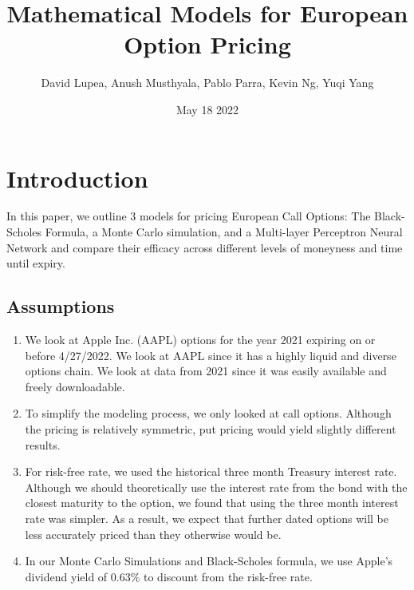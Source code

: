 \documentclass{article}
\title{Mathematical Models for European Option Pricing}
\author{David Lupea, Anush Musthyala, Pablo Parra, Kevin Ng, Yuqi Yang }
\date{May 18 2022}
\begin{document}
\maketitle
\tableofcontents 
\newpage

\section{Introduction}
In this paper, we outline 3 models for pricing European Call Options: The Black-Scholes Formula, a Monte Carlo simulation, and a Multi-layer Perceptron Neural Network and compare their efficacy across different levels of moneyness and time until expiry.

\subsection{Assumptions}
\begin{enumerate}
    \item We look at Apple Inc. (AAPL) options for the year 2021 expiring on or before 4/27/2022. We look at AAPL since it has a highly liquid and diverse options chain. We look at data from 2021 since it was easily available and freely downloadable.
    \item To simplify the modeling process, we only looked at call options. Although the pricing is relatively symmetric, put pricing would yield slightly different results. 
    \item For risk-free rate, we used the historical three month Treasury interest rate. Although we should theoretically use the interest rate from the bond with the closest maturity to the option, we found that using the three month interest rate was simpler. As a result, we expect that further dated options will be less accurately priced than they otherwise would be.
    \item In our Monte Carlo Simulations and Black-Scholes formula, we use Apple's dividend yield of 0.63\% to discount from the risk-free rate. 
\end{enumerate}










\appendix



\printbibliography
\end{document}
